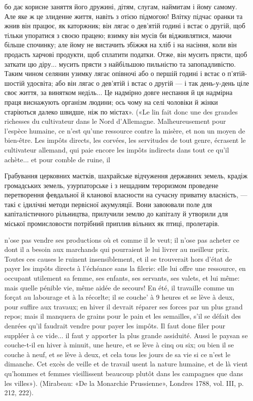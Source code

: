 {бо дає корисне заняття його дружині, дітям, слугам, наймитам і йому
самому. Але яке ж це злиденне життя, навіть з отією підмогою! Влітку
підчас оранки та жнив він працює, як каторжник; він лягає о дев’ятій
годині і встає о другій, щоб тільки упоратися з своєю працею; взимку
він мусів би відживлятися, маючи більше спочинку; але йому не вистачить
збіжжя на хліб і на насіння, коли він продасть харчові продукти,
щоб сплатити податки. Отже, він мусить прясти, щоб заткати цю діру...
мусить прясти з найбільшою пильністю та запопадливістю. Таким чином
селянин узимку лягає опівночі або о першій годині і встає о п’ятій-шостій
удосвіта; або він лягає о дев’ятій і встає о другій — і так день-у-день
ціле своє життя, за винятком неділь... Це надмірно довге неспання й ця
надмірна праця виснажують організм людини; ось чому на селі чоловіки
й жінки старіються далеко швидше, ніж по містах». («Le lin fait donc
une des grandes richesses du cultivateur dans le Nord d’Allemagne. Malheureusement
pour l’espèce humaine, ce n’est qu’une ressource contre la
misère, et non un moyen de bien-être. Les impôts directs, les corvées, les
servitudes de tout genre, écrasent le cultivateur allemand, qui paie encore
les impôts indirects dans tout ce qu’il achète... et pour comble de ruine, il
}

Грабування церковних маєтків, шахрайське відчуження державних
земель, крадіж громадських земель, узурпаторське і з
нещадним тероризмом проведене перетворення февдальної й
кланової власности на сучасну приватну власність, — такі є
ідилічні методи первісної акумуляції. Вони завоювали поле
для капіталістичного рільництва, прилучили землю до капіталу
й утворили для міської промисловости потрібний приплив вільних
як птиці, пролетарів.

n’ose pas vendre ses productions où et comme il le veut; il n’ose pas acheter
ce dont il a besoin aux marchands qui pourraient le lui livrer au meilleur
prix. Toutes ces causes le ruinent insensiblement, et il se trouverait hors
d'état de payer les impôts directs à l’échéance sans la filerie: elle lui offre
une ressource, en occupant utilement sa femme, ses enfants, ses servants, ses valets,
et lui même: mais quelle pénible vie, même aidée de secours! En été, il
travaille comme un forçat au labourage et à la récorlte; il se couche’ à
9 heures et se lève à deux, pour suffire aux travaux; en hiver il devrait réparer
ses forces par un plus grand repos; mais il manquera de grains pour le
pain et les semailles, s’il se défait des denrées qu’il faudrait vendre pour payer
les impôts. Il faut done filer pour suppléer à ce vide... il faut y apporter
la plus grande assiduité. Aussi le paysan se couche-t-il en hiver à
minuit, une heure, et se lève à cinq ou six; ou bien il se couche à neuf, et
se lève à deux, et cela tous les jours de sa vie si ce n’est le dimanche. Cet
excès de veille et de travail usent la nature humaine, et de là vient qu’hommes
et femmes vieillissent beaucoup plutôt dans les campagnes que dans
les villes»). (Mirabeau: «De la Monarchie Prussienne», Londres 1788,
vol. III, p. 212, 222).

